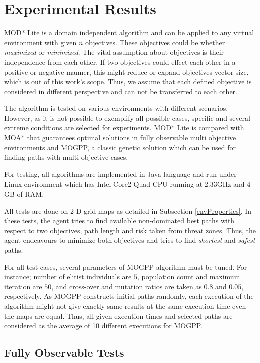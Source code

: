 \section{Experimental Results}
\label{chapter:experiments}

MOD* Lite is a domain independent algorithm and can be applied to any virtual environment with given $n$ objectives. These objectives could be whether \textit{maximized} or \textit{minimized}. The vital assumption about objectives is their independence from each other. If two objectives could effect each other in a positive or negative manner, this might reduce or expand objectives vector size, which is out of this work's scope. Thus, we assume that each defined objective is considered in different perspective and can not be transferred to each other.

The algorithm is tested on various environments with different scenarios. However, as it is not possible to exemplify all possible cases, specific and several extreme conditions are selected for experiments. MOD* Lite is compared with MOA* that guarantees optimal solutions in fully observable multi objective environments and MOGPP, a classic genetic solution which can be used for finding paths with multi objective cases.

For testing, all algorithms are implemented in Java language and run under Linux environment which has Intel Core2 Quad CPU running at 2.33GHz and 4 GB of RAM.

All tests are done on 2-D grid maps as detailed in Subsection \ref{envProperties}. In these tests, the agent tries to find available non-dominated best paths with respect to two objectives, path length and risk taken from threat zones. Thus, the agent endeavours to minimize both objectives and tries to find \textit{shortest} and \textit{safest} paths.

For all test cases, several parameters of MOGPP algorithm must be tuned. For instance; number of elitist individuals are $5$, population count and maximum iteration are $50$, and cross-over and mutation ratios are taken as $0.8$ and $0.05$, respectively. As MOGPP constructs initial paths randomly, each execution of the algorithm might not give exactly same results at the same execution time even the maps are equal. Thus, all given execution times and selected paths are considered as the average of 10 different executions for MOGPP.

\subsection{Fully Observable Tests}

